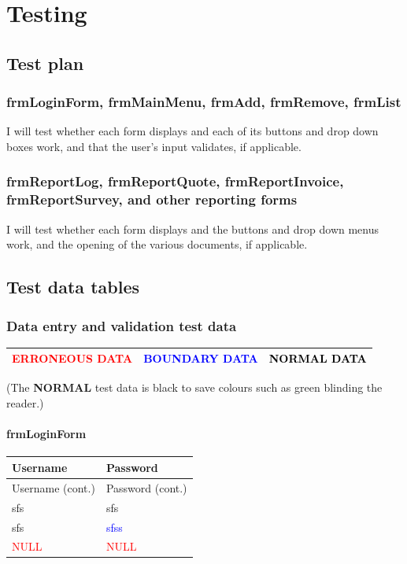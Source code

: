 \chapter{Testing}

\section{Test plan}

\subsection{frmLoginForm, frmMainMenu, frmAdd, frmRemove, frmList}

I will test whether each form displays and each of its buttons and drop down boxes work, and that the user's input validates, if applicable.

\subsection{frmReportLog, frmReportQuote, frmReportInvoice, frmReportSurvey, and other reporting forms}

I will test whether each form displays and the buttons and drop down menus work, and the opening of the various documents, if applicable.

\section{Test data tables}

\subsection{Data entry and validation test data}

\begin{longtable}{ | p{4cm} | p{4cm} | p{4cm} | }
	\hline
	\textbf{\textcolor{red}{ERRONEOUS DATA}} & \textbf{\textcolor{blue}{BOUNDARY DATA}} & \textbf{\textcolor{black}{NORMAL DATA}}\\
	\hline
\end{longtable}

(The \textbf{NORMAL} test data is black to save colours such as green blinding the reader.)

\subsubsection{frmLoginForm}

\begin{longtable}{ | p{5cm} | p{5cm} | }
	\hline
	\textbf{Username} & \textbf{Password}\\
	\endfirsthead
	\hline
	Username (cont.) & Password (cont.)\\
	\endhead
	\hline
	sfs & sfs\\
	\hline
	sfs & \textcolor{blue}{sfss}\\
	\hline
	\textcolor{red}{NULL} & \textcolor{red}{NULL}\\
	\hline
\end{longtable}

